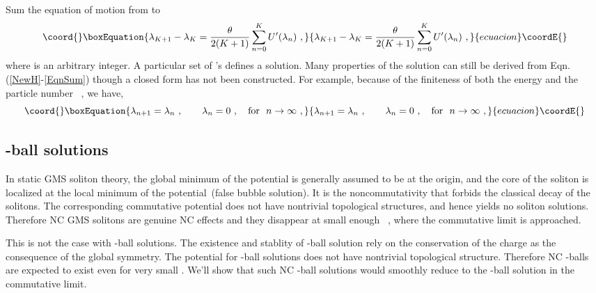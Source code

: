 \documentclass[a4paper,a4paper]{article}
\begin{document}
Sum the equation of motion from \coordHE{} to \coordHE{}
\begin{equation}\coord{}\boxEquation{
\lambda_{K+1}-\lambda_K=\frac\theta{2(K+1)}\sum_{n=0}^K U'(\lambda_n)\
, \label{EqnSum}
}{
\lambda_{K+1}-\lambda_K=\frac\theta{2(K+1)}\sum_{n=0}^K U'(\lambda_n)\
, }{ecuacion}\coordE{}\end{equation}
where \myHighlight{$K\geq 0$}\coordHE{} is an arbitrary integer.  A particular set of
\myHighlight{$\lambda_n$}\coordHE{}'s defines a solution. Many properties of the solution can
still be derived from Eqn. (\ref{NewH}-\ref{EqnSum}) though a closed
form has not been constructed.  For example, because of the
finiteness of both the energy \myHighlight{$H$}\coordHE{} and the particle number \coordHE{}\ , we have,
\begin{equation}\coord{}\boxEquation{
\lambda_{n+1}=\lambda_n\ ,\qquad \lambda_n=0\ ,~~~\mbox{for}~~
n\rightarrow \infty\ ,                                                                          \label{LambdaC}
}{
\lambda_{n+1}=\lambda_n\ ,\qquad \lambda_n=0\ ,~~~\mbox{for}~~
n\rightarrow \infty\ ,                                                                          }{ecuacion}\coordE{}\end{equation}

\subsection{\myHighlight{$Q$}\coordHE{}-ball solutions}

In static GMS soliton theory, the global minimum of the potential is
generally assumed to be at the origin, and the core of the soliton is
localized at the local minimum of the potential~(false bubble
solution). It is the noncommutativity that forbids the classical
decay of the solitons.  The corresponding commutative potential does
not have nontrivial topological structures, and hence yields no
soliton solutions. Therefore NC GMS solitons are genuine
NC effects and they disappear at small enough \myHighlight{$\theta$}\coordHE{}\ ,
where the commutative limit is approached.

This is not the case with \coordHE{}-ball solutions. The existence and
stablity of \coordHE{}-ball solution rely on the conservation of the
charge \coordHE{} as the consequence of the global symmetry. The potential
for \myHighlight{$Q$}\coordHE{}-ball solutions does not have nontrivial topological
structure. Therefore NC \coordHE{}-balls are expected to exist even for very
small \myHighlight{$\theta$}\coordHE{} . We'll show that such NC \myHighlight{$Q$}\coordHE{}-ball solutions would
smoothly reduce to the \myHighlight{$Q$}\coordHE{}-ball solution in the commutative limit.
\end{document}
